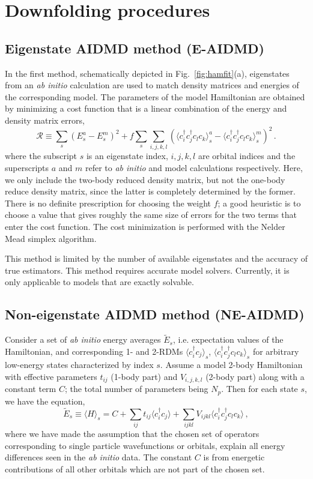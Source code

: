 \documentclass[aps, prb]{revtex4-1}
\begin{document}
\section{Downfolding procedures}
\label{sec:fitting}
\subsection{Eigenstate AIDMD method (E-AIDMD)}
In the first method, schematically depicted in Fig.~\ref{fig:hamfit}(a), 
eigenstates from an {\it ab initio} calculation
are used to match density matrices and energies of the corresponding model. 
The parameters of the model Hamiltonian are obtained by  
minimizing a cost function that is a linear combination 
of the energy and density matrix errors,
\begin{equation}
	\mathcal{R} \equiv \sum_{s} (E_s^{a}-E_s^{m})^{2} + f \sum_{s} \sum_{i,j,k,l} (\langle c_i^{\dagger} c_j^{\dagger} c_l c_k \rangle^{a}_{s} - \langle c_i^{\dagger} c_j^{\dagger} c_l c_k \rangle^{m}_{s} )^2 \,.
\end{equation}
where the subscript $s$ is an eigenstate index, $i,j,k,l$ are orbital indices 
and the superscripts $a$ and $m$ refer to {\it ab initio} and model 
calculations respectively. Here, we only include the two-body reduced density matrix, but not the one-body reduce density matrix, since the latter is completely determined by the former. There is no definite prescription for choosing 
the weight $f$;
a good heuristic is to choose a value that gives roughly the same size 
of errors for the two terms that enter the cost function. 
The cost minimization is performed with the Nelder Mead simplex algorithm. 

This method is limited by the number of available eigenstates and the accuracy of true estimators. This method requires accurate model solvers. Currently, it is only applicable to models that are exactly solvable. 
\subsection{Non-eigenstate AIDMD method (NE-AIDMD)}
\label{sec:AxE}
Consider a set of {\it ab initio} energy averages $\tilde{E}_s$, i.e. expectation values of the Hamiltonian, 
and corresponding 1- and 2-RDMs $\langle c_i^{\dagger} c_j \rangle_s$, 
$\langle c_i^{\dagger}c_j^{\dagger} c_l c_k \rangle_s$ 
for arbitrary low-energy states characterized by index $s$. 
Assume a model 2-body Hamiltonian with 
effective parameters $t_{ij}$ (1-body part) 
and $V_{i,j,k,l}$ (2-body part) along with a constant term $C$; 
the total number of parameters being $N_p$. 
Then for each state $s$, we have the equation, 
\begin{equation}
	\tilde{E}_s \equiv \langle H \rangle_s = C + \sum_{ij} t_{ij} \langle c_i^{\dagger} c_j \rangle + \sum_{ijkl} V_{ijkl} \langle c_i^{\dagger}c_j^{\dagger} c_l c_k \rangle  \,,
\end{equation}
where we have made the assumption that the chosen set of operators 
corresponding to single particle wavefunctions or orbitals, 
explain all energy differences seen in the 
{\it ab initio} data. The constant $C$ is from energetic contributions 
of all other orbitals which are not part of the chosen set.  
\end{document}
